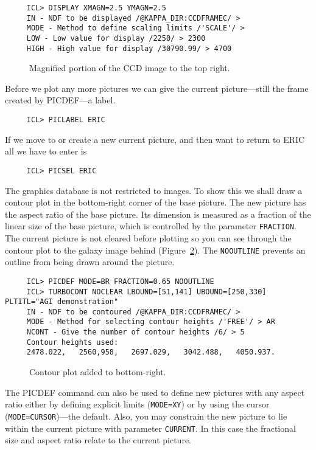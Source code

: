 {\small
\begin{verbatim}
     ICL> DISPLAY XMAGN=2.5 YMAGN=2.5
     IN - NDF to be displayed /@KAPPA_DIR:CCDFRAMEC/ >
     MODE - Method to define scaling limits /'SCALE'/ >
     LOW - Low value for display /2250/ > 2300
     HIGH - High value for display /30790.99/ > 4700
\end{verbatim}
\normalsize
\begin{figure}[htb]
\caption{Magnified portion of the CCD image to the top right.}
\label{fi:agi3}
\vspace{4.4in}
\end{figure}
Before we plot any more pictures we can give the current picture---still
the frame created by PICDEF---a label.

\small
\begin{verbatim}
     ICL> PICLABEL ERIC
\end{verbatim}
\normalsize
If we move to or create a new current picture, and then want to return
to ERIC all we have to enter is

\small
\begin{verbatim}
     ICL> PICSEL ERIC
\end{verbatim}
\normalsize

The graphics database is not restricted to images.  To show this we shall
draw a contour plot in the bottom-right corner of the base picture.  The new
picture has the aspect ratio of the base picture.  Its dimension is
measured as a fraction of the linear size of the base picture, which is
controlled by the parameter {\tt FRACTION}. The current picture is not
cleared before plotting so you can see through the contour plot to the
galaxy image behind (Figure~\ref{fi:agi4}).  The {\tt NOOUTLINE}
prevents an outline from being drawn around the picture.

\small
\begin{verbatim}
     ICL> PICDEF MODE=BR FRACTION=0.65 NOOUTLINE
     ICL> TURBOCONT NOCLEAR LBOUND=[51,141] UBOUND=[250,330] PLTITL="AGI demonstration"
     IN - NDF to be contoured /@KAPPA_DIR:CCDFRAMEC/ >
     MODE - Method for selecting contour heights /'FREE'/ > AR
     NCONT - Give the number of contour heights /6/ > 5
     Contour heights used:
     2478.022,   2560,958,   2697.029,   3042.488,   4050.937.
\end{verbatim}
\normalsize
\begin{figure}[htb]
\caption{Contour plot added to bottom-right.}
\label{fi:agi4}
\vspace{4.4in}
\end{figure}
The PICDEF command can also be used to define new pictures with any
aspect ratio either by defining explicit limits ({\tt MODE=XY}) or
by using the cursor ({\tt MODE=CURSOR})---the default.  Also, you may
constrain the new picture to lie within the current picture with
parameter {\tt CURRENT}. In this case the fractional size and aspect ratio
relate to the current picture.

}
